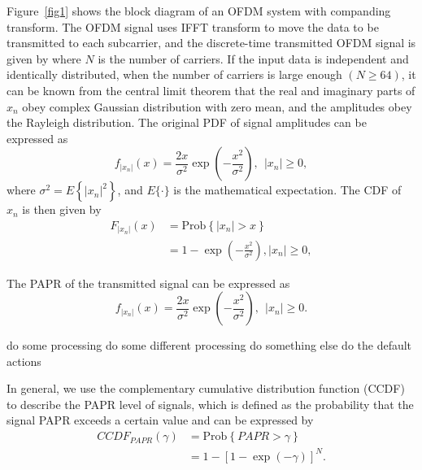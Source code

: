 \documentclass{ccjnl}
\begin{document}
Figure~\ref{fig1} shows  the block diagram of an OFDM system with companding transform. The OFDM signal uses IFFT transform to move the data to be transmitted to each subcarrier, and the discrete-time transmitted OFDM signal is given by where $N$ is the number of carriers. If the input data is independent and identically distributed, when the number of carriers is large enough $(N \geqslant 64)$, it can be known from the central limit theorem that the real and imaginary parts of ${x_n}$ obey complex Gaussian distribution with zero mean, and the amplitudes obey the Rayleigh distribution. The original PDF of signal amplitudes can be expressed as 
\begin{equation}
{f_{\left| {{x_n}} \right|}}(x) = \frac{{2x}}{{{\sigma ^2}}}\exp \left( { - \frac{{{x^2}}}{{{\sigma ^2}}}} \right),~~\left| {{x_n}} \right| \geqslant 0,
\label{eq2}
\end{equation}
where $\sigma^{2}=E\left\{\left|x_{n}\right|^{2}\right\}$, and $E\{\cdot\}$ is the mathematical expectation. The CDF of ${x_n}$ is then given by
\begin{equation}
\begin{aligned}
{F_{\left| {{x_n}} \right|}}(x) &= {\text{Prob}}\left\{ {\left| {{x_n}} \right| > x} \right\}\\
&= 1 - \exp \left( { - \frac{{{x^2}}}{{{\sigma ^2}}}} \right),
\left| {{x_n}} \right| \geqslant 0,
\end{aligned}
\label{eq3}
\end{equation}

The PAPR of the transmitted signal can be expressed as
\begin{equation}
{f_{\left| {{x_n}} \right|}}(x) = \frac{{2x}}{{{\sigma ^2}}}\exp \left( { - \frac{{{x^2}}}{{{\sigma ^2}}}} \right),~~\left| {{x_n}} \right| \geqslant 0.
\label{eq4}
\end{equation}

\begin{algorithm*}[!ht]
\caption{Algorithm example.}
\label{algorithm1}
\begin{algorithmic}[1]
\STATE do some processing 
\STATE do some different processing 
\STATE do something else 
\ELSE 
\STATE do the default actions 
\ENDIF 
\end{algorithmic}
\end{algorithm*}


In general, we use the complementary cumulative distribution function (CCDF) to describe the PAPR level of signals, which is defined as the probability that the signal PAPR exceeds a certain value and can be expressed by
\begin{equation}
\begin{aligned}
CCD{F_{PAPR}}\left( \gamma  \right)& = {\text{Prob}}\left\{ {PAPR > \gamma } \right\} \\
&=1 - {\left[ {1 - \exp \left( { - \gamma } \right)} \right]^N}.
\end{aligned}
\label{eq5}
\end{equation}
\end{document}

